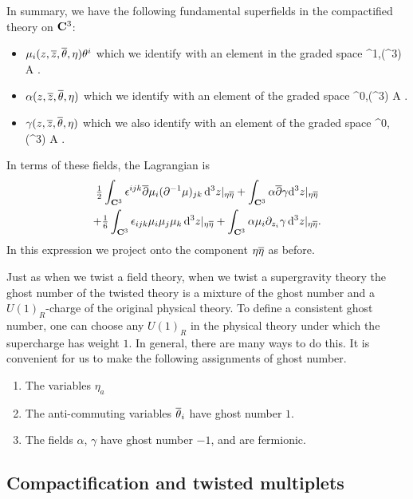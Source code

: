 \documentclass[../main.tex]{subfiles}
\begin{document}
In summary, we have the following fundamental superfields in the compactified theory on $\mathbf{C}^3$:
\begin{itemize}
\item $\mu_i (z,{\overline{z}},\overline{\theta}, \eta) \theta^i$ which we identify with an element in the graded space
\beqn
\mu \in \PV^{1,\bu}(\C^3) \otimes A .
\eeqn
\item $\alpha (z,{\overline{z}},\overline \theta, \eta)$ which we identify with an element of the graded space
\beqn
\alpha \in \Omega^{0,\bu}(\C^3) \otimes A .
\eeqn
\item $\gamma(z,{\overline{z}},\overline \theta, \eta)$ which we also identify with an element of the graded space
\beqn
\gamma \in \Omega^{0,\bu}(\C^3) \otimes A .
\eeqn
\end{itemize}
In terms of these fields, the Lagrangian is
\begin{multline} 
	\tfrac{1}{2}\int_{\mathbf{C}^{3}}   {\epsilon}^{ijk} \overline{\partial} \mu_{i} (\partial^{-1}  \mu)_{jk} \, \mathrm{d}^3 z |_{\eta \overline \eta}   + \int_{\mathbf{C}^{3}}  \alpha \overline{\partial} \gamma \mathrm{d}^3 z  |_{\eta \overline{\eta}} 
	\\
	+ \tfrac{1}{6} \int_{\mathbf{C}^{3}}  {\epsilon}_{ijk} \mu_{i}\mu_{j} \mu_{k} \, \mathrm{d}^3 z |_{\eta \overline{\eta}} + \int_{\mathbf{C}^{3}}  \alpha \mu_i \partial_{z_i}  \gamma \, \mathrm{d}^3 z|_{\eta \overline{\eta}} .
\end{multline} 
In this expression we project onto the component $\eta \overline \eta$ as before.

Just as when we twist a field theory, when we twist a supergravity theory the ghost number of the twisted theory  is a mixture of the ghost number and a $U(1)_R$-charge of the original physical theory. To define a consistent ghost number, one can choose any $U(1)_R$ in the physical theory under which the supercharge has weight $1$.  In general, there are many ways to do this.  It is convenient for us to make the following assignments of ghost number.
\begin{enumerate} 
	\item The variables $\eta_a$ 
	\item The anti-commuting variables $\overline{\theta}_i$ have ghost number $1$.
	\item The fields $\alpha$, $\gamma$ have ghost number $-1$, and are fermionic.
\end{enumerate}

\subsection{Compactification and twisted multiplets}
\end{document}
